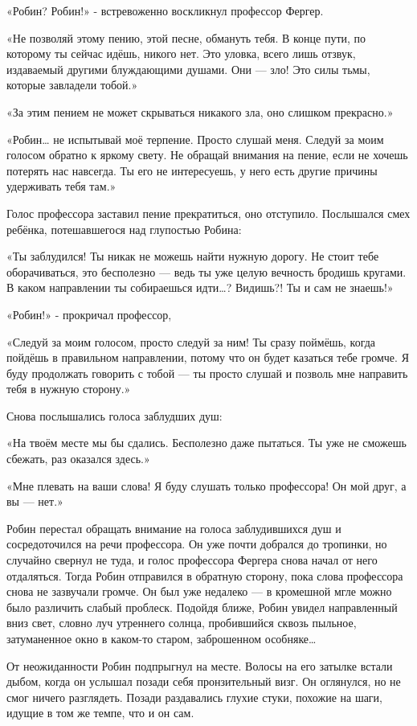 \documentclass[a5paper, 9pt,
final, openany, twoside=true]{memoir}
\begin{document}
«Робин? Робин!» - встревоженно воскликнул профессор Фергер.

«Не позволяй этому пению, этой песне, обмануть тебя. В конце пути, по которому ты сейчас идёшь, никого нет. Это уловка, всего лишь отзвук, издаваемый другими блуждающими душами. Они — зло! Это силы тьмы, которые завладели тобой.»

«За этим пением не может скрываться никакого зла, оно слишком прекрасно.»

«Робин… не испытывай моё терпение. Просто слушай меня. Следуй за моим голосом обратно к яркому свету. Не обращай внимания на пение, если не хочешь потерять нас навсегда. Ты его не интересуешь, у него есть другие причины удерживать тебя там.»

Голос профессора заставил пение прекратиться, оно отступило. Послышался смех ребёнка, потешавшегося над глупостью Робина:

«Ты заблудился! Ты никак не можешь найти нужную дорогу. Не стоит тебе оборачиваться, это бесполезно — ведь ты уже целую вечность бродишь кругами. В каком направлении ты собираешься идти…? Видишь?! Ты и сам не знаешь!»

«Робин!» - прокричал профессор,

«Следуй за моим голосом, просто следуй за ним! Ты сразу поймёшь, когда пойдёшь в правильном направлении, потому что он будет казаться тебе громче. Я буду продолжать говорить с тобой — ты просто слушай и позволь мне направить тебя в нужную сторону.»

Снова послышались голоса заблудших душ:

«На твоём месте мы бы сдались. Бесполезно даже пытаться. Ты уже не сможешь сбежать, раз оказался здесь.»

«Мне плевать на ваши слова! Я буду слушать только профессора! Он мой друг, а вы — нет.»\bigskip

Робин перестал обращать внимание на голоса заблудившихся душ и сосредоточился на речи профессора. Он уже почти добрался до тропинки, но случайно свернул не туда, и голос профессора Фергера снова начал от него отдаляться. Тогда Робин отправился в обратную сторону, пока слова профессора снова не зазвучали громче. Он был уже недалеко — в кромешной мгле можно было различить слабый проблеск. Подойдя ближе, Робин увидел направленный вниз свет, словно луч утреннего солнца, пробившийся сквозь пыльное, затуманенное окно в каком-то старом, заброшенном особняке…

От неожиданности Робин подпрыгнул на месте. Волосы на его затылке встали дыбом, когда он услышал позади себя пронзительный визг. Он оглянулся, но не смог ничего разглядеть. Позади раздавались глухие стуки, похожие на шаги, идущие в том же темпе, что и он сам.
\end{document}
